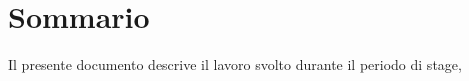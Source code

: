 \cleardoublepage
{}
{}
\begingroup
\let\clearpage\relax
\let\cleardoublepage\relax
\chapter*{Sommario}

Il presente documento descrive il lavoro svolto durante il periodo di stage, \lipsum[1]

\endgroup
\vfill
